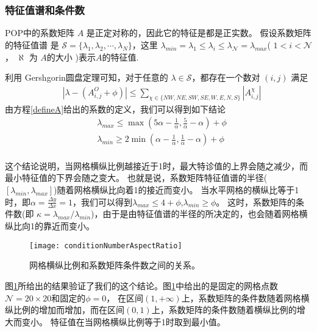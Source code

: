 \subsubsection{特征值谱和条件数}
\label{solver:Algorithm:condition}

POP中的系数矩阵 $A$ 是正定对称的\cite{smith2010parallel}，因此它的特征是都是正实数\cite{stewart1976positive}。
假设系数矩阵的特征值谱\cite{golub2012matrix} 是 $\mathcal{S} = \{\lambda_1, \lambda_2, \cdots, \lambda_N\}$，这里 $\lambda_{min} = \lambda_1 \le \lambda_i \le \lambda_\mathcal{N} = \lambda_{max}$( $1<i <\mathcal{N}$， $\aleph$ 为 $A$的大小 )表示$A$的特征值.

利用 Gershgorin圆盘定理\cite{bell1965gershgorin}可知，对于任意的 $\lambda \in \mathcal{S}$，都存在一个数对 $(i,j)$ 满足
\begin{align}
&|\lambda -  (A_{i,j}^O + \phi ) | \le \sum_{\chi \in \{NW,NE,SW,SE,W,E,N,S\}}|A_{i,j}^\chi|
\end{align}
由方程\ref{defineA}给出的系数的定义，我们可以得到如下结论 
\begin{align} \label{eigsGersh}
&\lambda_{max} \le  \max (  5\alpha - \frac{1}{\alpha}, \frac{5}{\alpha}- \alpha) +\phi   \\
&\lambda_{min} \ge 2\min (  \alpha - \frac{1}{\alpha},\frac{1} {\alpha} -  \alpha) + \phi
\end{align}\\

 
这个结论说明，当网格横纵比例越接近于1时，最大特诊值的上界会随之减少，而最小特征值的下界会随之变大。
也就是说，系数矩阵特征值谱的半径($[\lambda_{min}, \lambda_{max}]$)随着网格横纵比向着1的接近而变小。 
当水平网格的横纵比等于1时，即$ \alpha = \frac{ \Delta y}{ \Delta x} = 1$，我们可以得到$\lambda_{max} \le  4 +\phi$,$\lambda_{min} \ge   \phi$。
这时，系数矩阵的条件数(即 $\kappa=  \lambda_{max}/\lambda_{min}$)，由于是由特征值谱的半径的所决定的，也会随着网格横纵比向1的靠近而变小。 

\begin{figure}[ht]
\centering
\texttt{[image: conditionNumberAspectRatio]}
\caption[] {网格横纵比例和系数矩阵条件数之间的关系。 \label{fig:conditionNumberRatio}}
\end{figure}




图\ref{fig:conditionNumberRatio}所给出的结果验证了我们的这个结论。图\ref{fig:conditionNumberRatio}中给出的是固定的网格点数$\mathcal{N} = 20\times 20$和固定的$\phi = 0$， 在区间$(1, +\infty)$上，系数矩阵的条件数随着网格横纵比例的增加而增加，而在区间$(0,1)$上，系数矩阵的条件数随着横纵比例的增大而变小。
特征值在当网格横纵比例等于1时取到最小值。
 
